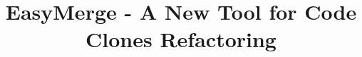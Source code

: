 \documentclass{acm_proc_article-sp}
\begin{document}
\title{EasyMerge - A New Tool for Code Clones Refactoring}
%
%
%
%
%
\end{document}
